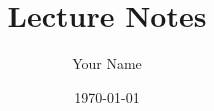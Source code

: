 \documentclass[notes]{ituphd}
\title{Lecture Notes}
\author{Your Name}
\date{\today}
\begin{document}
\makecover
\tableofcontents
\clearpage





\end{document}
